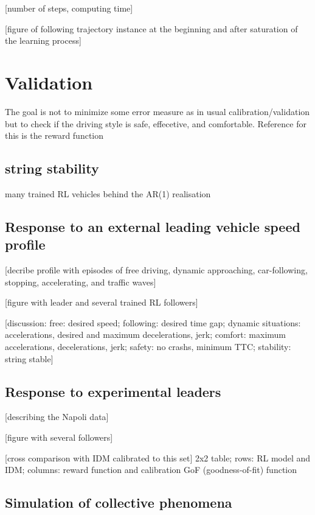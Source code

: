 \documentclass[review]{elsarticle}
\begin{document}
[number of steps, computing time]

[figure of following trajectory instance at the beginning and after
  saturation of the 
  learning process]


\section{Validation}

The goal is not to minimize some error measure as in usual
calibration/validation but to check if the driving style is safe,
effecetive, and comfortable. Reference for this is the reward function

\subsection{string stability}

many trained RL vehicles behind the AR(1) realisation

\subsection{Response to an external leading vehicle speed profile}

[decribe profile with episodes of free driving, dynamic approaching,
  car-following, stopping, accelerating, and traffic waves]

[figure with leader and several trained RL followers]

[discussion: free: desired speed; following: desired time gap; dynamic
  situations: accelerations, desired and maximum  decelerations, jerk;
comfort: maximum accelerations, decelerations, jerk;
  safety: no crashs, minimum TTC; stability: string stable]


\subsection{Response to experimental leaders}

[describing the Napoli data]

[figure with several followers]

[cross comparison with IDM calibrated to this set]
2x2 table; rows: RL model and IDM;
columns: reward function and calibration GoF (goodness-of-fit) function


\subsection{Simulation of collective phenomena}
\end{document}
